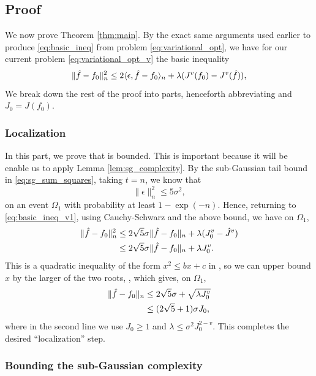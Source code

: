 \documentclass{article}
\begin{document}
\subsection{Proof}

We now prove Theorem \ref{thm:main}. By the exact same arguments used earlier to
produce \eqref{eq:basic_ineq} from problem \eqref{eq:variational_opt}, we have
for our current problem \eqref{eq:variational_opt_v} the basic inequality     
\begin{equation}
\label{eq:basic_ineq_v1}
\|\hat{f} - f_0\|_n^2 \leq 2 \langle \epsilon, \hat{f}-f_0 \rangle_n + \lambda (J^v(f_0)
- J^v(\hat{f})), 
\end{equation} 
We break down the rest of the proof into parts, henceforth abbreviating
 and $J_0 = J(f_0)$.     

\subsubsection{Localization}

In this part, we prove that  is bounded. This is
important because it will be enable us to apply Lemma
\ref{lem:sg_complexity}. By the sub-Gaussian tail bound in
\eqref{eq:sg_sum_squares}, taking $t=n$, we know that    
\[
\|\epsilon\|_n^2 \leq 5\sigma^2,
\]
on an event $\Omega_1$ with probability at least $1-\exp(-n)$. Hence, returning
to  \eqref{eq:basic_ineq_v1}, using Cauchy-Schwarz and the above bound, we have
on $\Omega_1$, 
\begin{align*}
\|\hat{f}-f_0\|_n^2 &\leq 2{\sqrt 5}\sigma \|\hat{f}-f_0\|_n + 
  \lambda (J_0^v - {\hat  J}^v) \\  
&\leq 2{\sqrt 5}\sigma \|\hat{f}-f_0\|_n + \lambda J_0^v.
\end{align*}
This is a quadratic inequality of the form $x^2 \leq bx + c$ in , so we can upper bound $x$ by the larger of the two roots,
, which gives, on
$\Omega_1$, 
\begin{align}
\nonumber
\|\hat{f}-f_0\|_n &\leq 2{\sqrt 5}\sigma + \sqrt{\lambda J_0^v} \\
\label{eq:localization}
&\leq (2{\sqrt 5} + 1) \sigma J_0,
\end{align}
where in the second line we use $J_0\geq 1$ and $\lambda \leq \sigma^2 
J_0^{2-v}$. This completes the desired ``localization'' step.     

\subsubsection{Bounding the sub-Gaussian complexity}
\end{document}
